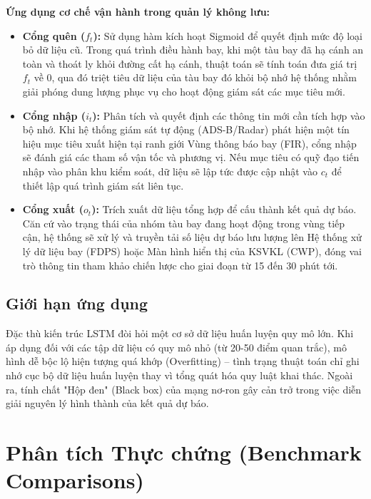\documentclass[12pt,a4paper]{article}
\begin{document}
\textbf{Ứng dụng cơ chế vận hành trong quản lý không lưu:}
\begin{itemize}
    \item \textbf{Cổng quên ($f_t$):} Sử dụng hàm kích hoạt Sigmoid để quyết định mức độ loại bỏ dữ liệu cũ. Trong quá trình điều hành bay, khi một tàu bay đã hạ cánh an toàn và thoát ly khỏi đường cất hạ cánh, thuật toán sẽ tính toán đưa giá trị $f_t$ về 0, qua đó triệt tiêu dữ liệu của tàu bay đó khỏi bộ nhớ hệ thống nhằm giải phóng dung lượng phục vụ cho hoạt động giám sát các mục tiêu mới.
    
    \item \textbf{Cổng nhập ($i_t$):} Phân tích và quyết định các thông tin mới cần tích hợp vào bộ nhớ. Khi hệ thống giám sát tự động (ADS-B/Radar) phát hiện một tín hiệu mục tiêu xuất hiện tại ranh giới Vùng thông báo bay (FIR), cổng nhập sẽ đánh giá các tham số vận tốc và phương vị. Nếu mục tiêu có quỹ đạo tiến nhập vào phân khu kiểm soát, dữ liệu sẽ lập tức được cập nhật vào $c_t$ để thiết lập quá trình giám sát liên tục.
    
    \item \textbf{Cổng xuất ($o_t$):} Trích xuất dữ liệu tổng hợp để cấu thành kết quả dự báo. Căn cứ vào trạng thái của nhóm tàu bay đang hoạt động trong vùng tiếp cận, hệ thống sẽ xử lý và truyền tải số liệu dự báo lưu lượng lên Hệ thống xử lý dữ liệu bay (FDPS) hoặc Màn hình hiển thị của KSVKL (CWP), đóng vai trò thông tin tham khảo chiến lược cho giai đoạn từ 15 đến 30 phút tới.
\end{itemize}

\subsection{Giới hạn ứng dụng}

Đặc thù kiến trúc LSTM đòi hỏi một cơ sở dữ liệu huấn luyện quy mô lớn. Khi áp dụng đối với các tập dữ liệu có quy mô nhỏ (từ 20-50 điểm quan trắc), mô hình dễ bộc lộ hiện tượng quá khớp (Overfitting) – tình trạng thuật toán chỉ ghi nhớ cục bộ dữ liệu huấn luyện thay vì tổng quát hóa quy luật khai thác. Ngoài ra, tính chất "Hộp đen" (Black box) của mạng nơ-ron gây cản trở trong việc diễn giải nguyên lý hình thành của kết quả dự báo.


\section{Phân tích Thực chứng (Benchmark Comparisons)}
\end{document}
